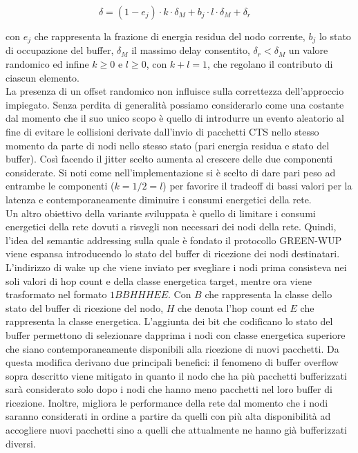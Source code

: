 \documentclass[binding=0.6cm,TFA]{sapthesis}
\begin{document}
\begin{equation}
    \delta= (1-e_{j}) \cdot k \cdot \delta_{M} + b_{j} \cdot l \cdot \delta_{M} + \delta_{r} \quad
\end{equation}

con $e_{j}$ che rappresenta la frazione di energia residua del nodo corrente, $b_{j}$ lo stato di occupazione del buffer, $\delta_{M}$ il massimo
delay consentito, $\delta_{r} < \delta_{M}$ un valore randomico ed infine $k \geq 0$ e $l \geq 0$, con $k+l=1$, che regolano il contributo di
ciascun elemento.\\

La presenza di un offset randomico non influisce sulla correttezza dell'approccio impiegato. Senza perdita di generalità possiamo considerarlo come una
costante dal momento che il suo unico scopo è quello di introdurre un evento aleatorio al fine di evitare le collisioni derivate dall'invio di pacchetti CTS
nello stesso momento da parte di nodi nello stesso stato (pari energia residua e stato del buffer). Così facendo il jitter scelto aumenta al crescere
delle due componenti considerate. Si noti come nell'implementazione si è scelto di dare pari peso ad entrambe le componenti ($k=1/2=l$) per favorire il
tradeoff di bassi valori per la latenza e contemporaneamente diminuire i consumi energetici della rete.\\

Un altro obiettivo della variante sviluppata è quello di limitare i consumi energetici della rete dovuti a risvegli non necessari dei nodi della rete. Quindi,
l'idea del semantic addressing sulla quale è fondato il protocollo GREEN-WUP viene espansa introducendo lo stato del buffer di ricezione dei nodi destinatari.
L'indirizzo di wake up che viene inviato per svegliare i nodi prima consisteva nei soli valori di hop count e della classe energetica target, mentre ora viene
trasformato nel formato $1BBHHHEE$. Con $B$ che rappresenta la classe dello stato del buffer di ricezione del nodo, $H$ che denota l'hop count ed $E$ che
rappresenta la classe energetica. L'aggiunta dei bit che codificano lo stato del buffer permettono di selezionare dapprima i nodi con classe energetica
superiore che siano contemporaneamente disponibili alla ricezione di nuovi pacchetti. Da questa modifica derivano due principali benefici: il fenomeno
di buffer overflow sopra descritto viene mitigato in quanto il nodo che ha più pacchetti bufferizzati sarà considerato solo dopo i nodi che hanno meno
pacchetti nel loro buffer di ricezione. Inoltre, migliora le performance della rete dal momento che i nodi saranno considerati in ordine a partire da quelli
con più alta disponibilità ad accogliere nuovi pacchetti sino a quelli che attualmente ne hanno già bufferizzati diversi.\\
\end{document}
